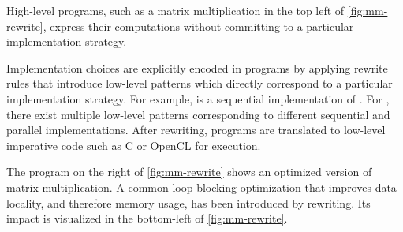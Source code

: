 High-level programs, such as a matrix multiplication in the top left of \cref{fig:mm-rewrite}, express their computations without committing to a particular implementation strategy.

Implementation choices are explicitly encoded in \Rise{} programs by applying rewrite rules that introduce low-level patterns which directly correspond to a particular implementation strategy.
For example,  is a sequential implementation of .
For , there exist multiple low-level patterns corresponding to different sequential and parallel implementations.
After rewriting, \Rise{} programs are translated to low-level imperative code such as C or OpenCL for execution.

The \Rise{} program on the right of \cref{fig:mm-rewrite} shows an optimized version of matrix multiplication.
A common loop blocking optimization that improves data locality, and therefore memory usage, has been introduced by rewriting.
Its impact is visualized in the bottom-left of \cref{fig:mm-rewrite}.


\newcommand{\mydim}[1]{\color{red}\tikz[baseline=(char.base)]{
    \node[shape=circle,draw,inner sep=1pt,minimum size=0pt] (char) {\tiny #1};}}

